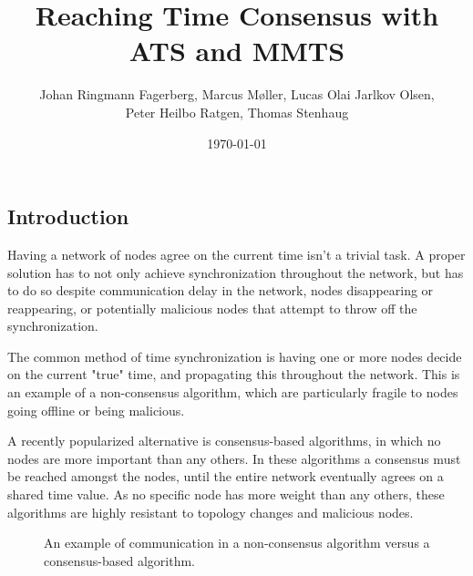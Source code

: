 \documentclass[a0,24pt]{sciposter}
\title{Reaching Time Consensus with ATS and MMTS}
\date{\today}
\author{Johan Ringmann Fagerberg, Marcus Møller, Lucas Olai Jarlkov Olsen,\\
  Peter Heilbo Ratgen, Thomas Stenhaug}
\institute{Institut for Matematik og Datalogi\\
            Syddansk Universitet}
\begin{document}
\maketitle

\begin{multicols}{2}


\section{Introduction}

Having a network of nodes agree on the current time isn't a trivial task. A proper solution has to not only achieve synchronization throughout the network, but has to do so despite communication delay in the network, nodes disappearing or reappearing, or potentially malicious nodes that attempt to throw off the synchronization.

The common method of time synchronization is having one or more nodes decide on the current "true" time, and propagating this throughout the network. This is an example of a non-consensus algorithm, which are particularly fragile to nodes going offline or being malicious.

A recently popularized alternative is consensus-based algorithms, in which no nodes are more important than any others. In these algorithms a consensus must be reached amongst the nodes, until the entire network eventually agrees on a shared time value. As no specific node has more weight than any others, these algorithms are highly resistant to topology changes and malicious nodes.

\begin{figure}[h!]
    \centering
    \captionsetup{type=figure,width=0.7\textwidth,justification=centering}
    \begin{tikzpicture}[inner sep=0pt,minimum size=0.4cm,scale=4.6]
        
    \end{tikzpicture}
    \hspace{2em}
    \begin{tikzpicture}[inner sep=0pt,minimum size=0.4cm,scale=4.6]
        
    \end{tikzpicture}
    \caption{An example of communication in a non-consensus algorithm versus a consensus-based algorithm.}
\end{figure}


\end{multicols}
\end{document}
